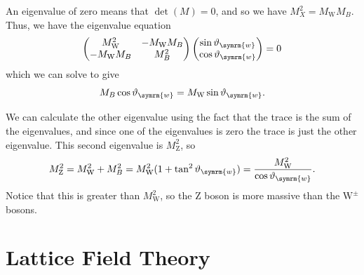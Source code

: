 \documentclass[fleqn]{NotesClass}
\newcommand{\Pparticle}[1]{\mathrm{#1}}
\newcommand{\PZ}{\ensuremath{\Pparticle{Z}}}
\newcommand{\PW}{\ensuremath{\Pparticle{W}}}
\newcommand{\PWpm}{\ensuremath{\Pparticle{W}^{\pm}}}
\newcommand{\bare}{\symrm{B}}
\newcommand{\weinbergangle}{\vartheta_{\symrm{w}}}
\begin{document}
    An eigenvalue of zero means that \(\det(M) = 0\), and so we have \(M_X^2 = M_{\PW}M_B\).
    Thus, we have the eigenvalue equation
    \begin{equation}
        \begin{pmatrix}
            M_{\PW}^2 & -M_{\PW}M_B\\
            -M_{\PW}M_B & M_B^2
        \end{pmatrix}
        \begin{pmatrix}
            \sin\weinbergangle\\
            \cos\weinbergangle
        \end{pmatrix}
        = 0
    \end{equation}
    which we can solve to give
    \begin{equation}
        M_B \cos\weinbergangle = M_{\PW}\sin\weinbergangle.
    \end{equation}
    
    We can calculate the other eigenvalue using the fact that the trace is the sum of the eigenvalues, and since one of the eigenvalues is zero the trace is just the other eigenvalue.
    This second eigenvalue is \(M_{\PZ}^2\), so
    \begin{equation}
        M_{\PZ}^2 = M_{\PW}^2 + M_B^2 = M_{\PW}^2(1 + \tan^2\weinbergangle) = \frac{M_{\PW}^2}{\cos\weinbergangle}.
    \end{equation}
    Notice that this is greater than \(M_{\PW}^2\), so the \PZ{} boson is more massive than the \PWpm{} bosons.
    
    
    
    
    
    
    
    
    
    \renewcommand{\bare}{0}
    
    
    
    
    
    
    
    
    
    
    
    
    
    \part{Lattice Field Theory}
\end{document}
